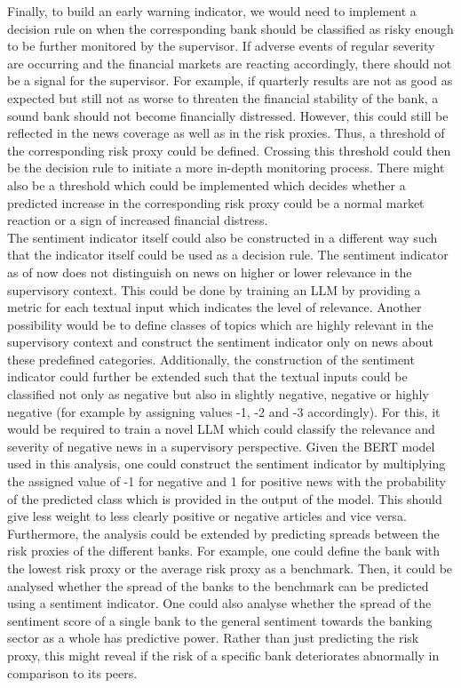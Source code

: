 Finally, to build an early warning indicator, we would need to implement a decision rule on when the corresponding bank should be classified as risky enough to be further monitored by the supervisor. If adverse events of regular severity are occurring and the financial markets are reacting accordingly, there should not be a signal for the supervisor. For example, if quarterly results are not as good as expected but still not as worse to threaten the financial stability of the bank, a sound bank should not become financially distressed. However, this could still be reflected in the news coverage as well as in the risk proxies. Thus, a threshold of the corresponding risk proxy could be defined. Crossing this threshold could then be the decision rule to initiate a more in-depth monitoring process. There might also be a threshold which could be implemented which decides whether a predicted increase in the corresponding risk proxy could be a normal market reaction or a sign of increased financial distress. \\

The sentiment indicator itself could also be constructed in a different way such that the indicator itself could be used as a decision rule. The sentiment indicator as of now does not distinguish on news on higher or lower relevance in the supervisory context. This could be done by training an LLM by providing a metric for each textual input which indicates the level of relevance. Another possibility would be to define classes of topics which are highly relevant in the supervisory context and construct the sentiment indicator only on news about these predefined categories. Additionally, the construction of the sentiment indicator could further be extended such that the textual inputs could be classified not only as negative but also in slightly negative, negative or highly negative (for example by assigning values -1, -2 and -3 accordingly). For this, it would be required to train a novel LLM which could classify the relevance and severity of negative news in a supervisory perspective. Given the BERT model used in this analysis, one could construct the sentiment indicator by multiplying the assigned value of -1 for negative and 1 for positive news with the probability of the predicted class which is provided in the output of the model. This should give less weight to less clearly positive or negative articles and vice versa. \\

Furthermore, the analysis could be extended by predicting spreads between the risk proxies of the different banks. For example, one could define the bank with the lowest risk proxy or the average risk proxy as a benchmark. Then, it could be analysed whether the spread of the banks to the benchmark can be predicted using a sentiment indicator. One could also analyse whether the spread of the sentiment score of a single bank to the general sentiment towards the banking sector as a whole has predictive power. Rather than just predicting the risk proxy, this might reveal if the risk of a specific bank deteriorates abnormally in comparison to its peers. \\

